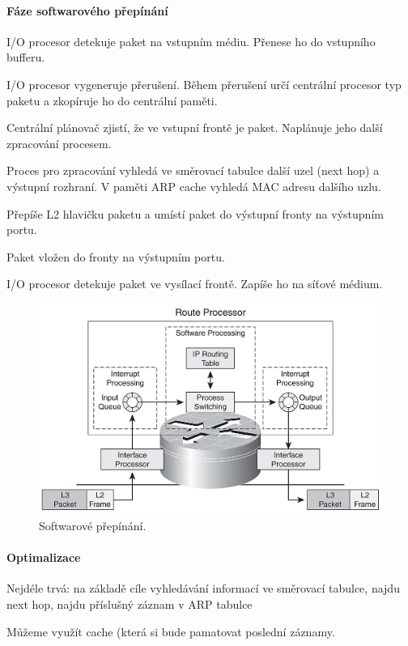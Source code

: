 \paragraph*{Fáze softwarového přepínání} \begin{compactenum}
    \item I/O procesor detekuje paket na vstupním médiu. Přenese ho do vstupního bufferu.
    \item I/O procesor vygeneruje přerušení. Během přerušení určí centrální procesor typ paketu a zkopíruje ho do centrální paměti.
    \item Centrální plánovač zjistí, že ve vstupní frontě je paket. Naplánuje jeho další zpracování procesem.
    \item Proces pro zpracování vyhledá ve směrovací tabulce další uzel (next hop) a výstupní rozhraní. V paměti ARP cache vyhledá MAC adresu dalšího uzlu.
    \item Přepíše L2 hlavičku paketu a umístí paket do výstupní fronty na výstupním portu.
    \item Paket vložen do fronty na výstupním portu.
    \item I/O procesor detekuje paket ve vysílací frontě. Zapíše ho na síťové médium.
\end{compactenum}

\begin{figure}[H]
    \centering
    \includegraphics[width=1\linewidth]{softwarove_prepinani.png}
    \caption{Softwarové přepínání.}
\end{figure}

\paragraph*{Optimalizace} \begin{compactitem}
    \item Nejdéle trvá: na základě cíle vyhledávání informací ve směrovací tabulce, najdu next hop, najdu příslušný záznam v ARP tabulce
    \item Můžeme využít cache (která si bude pamatovat poslední záznamy.
\end{compactitem}

